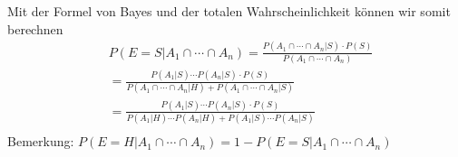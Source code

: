 Mit der Formel von Bayes und der totalen Wahrscheinlichkeit  können wir somit berechnen
\begin{align*}
& P(E=S |  A_1 \cap \cdots \cap A_n) = \frac{P(A_1 \cap \cdots \cap A_n | S) \cdot P(S)}{P(A_1 \cap \cdots \cap A_n)} \\
&=  \frac{P(A_1 | S) \cdots P(A_n | S) \cdot P(S)}{P(A_1 \cap \cdots \cap A_n | H) + P(A_1 \cap \cdots \cap A_n | S)} \\
&=  \frac{P(A_1 | S) \cdots P(A_n | S) \cdot P(S)}{P(A_1 | H) \cdots P(A_n | H)  + P(A_1 | S) \cdots P(A_n | S) } \\
\end{align*}
Bemerkung: $P(E=H |  A_1 \cap \cdots \cap A_n) = 1- P(E=S |  A_1 \cap \cdots \cap A_n) $





